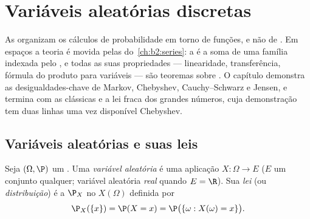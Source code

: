 \chapter{Variáveis aleatórias discretas}\label{ch:b2:randomvar}

As  organizam os cálculos de probabilidade em torno de
funções, e não de . Em espaços  a teoria é
movida pelas  do~\cref{ch:b2:series}:
a  é a soma de uma família indexada pelo ,
e todas as suas propriedades --- linearidade, transferência, fórmula do produto
para variáveis  --- são teoremas sobre . O capítulo demonstra as desigualdades-chave de Markov,
Chebyshev, Cauchy--Schwarz e Jensen, e termina com as  clássicas
e a lei fraca dos grandes números, cuja demonstração tem duas linhas
uma vez disponível Chebyshev.

\section{Variáveis aleatórias e suas leis}

\begin{definition}\label{def:b2:randomvar:law}
Seja $(\Omega, \P)$ um  . Uma
\emph{variável aleatória} é uma aplicação $X \colon \Omega \to E$ ($E$ um conjunto
qualquer; variável aleatória \emph{real} quando $E = \R$). Sua \emph{lei}
(ou \emph{distribuição}) é a  $\P_X$ no
 $X(\Omega)$ definida por
\[
\P_X(\{x\}) = \P(X = x)
= \P\bigl(\{\omega : X(\omega) = x\}\bigr) .
\]
\end{definition}

